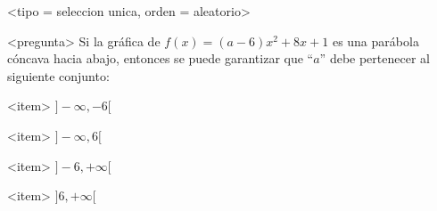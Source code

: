 <tipo = seleccion unica, orden = aleatorio>

<pregunta>
Si la gr\'afica de $f(x) = (a -6)x^2+8x +1$ es una par\'abola c\'oncava hacia abajo, entonces se puede garantizar que ``$a$'' debe pertenecer al siguiente conjunto:


<item>
$]{-}\infty, -6[$

<item>
$]{-}\infty, 6[$

<item>
$]-6, +\infty[$

<item>
$]6, +\infty[$



